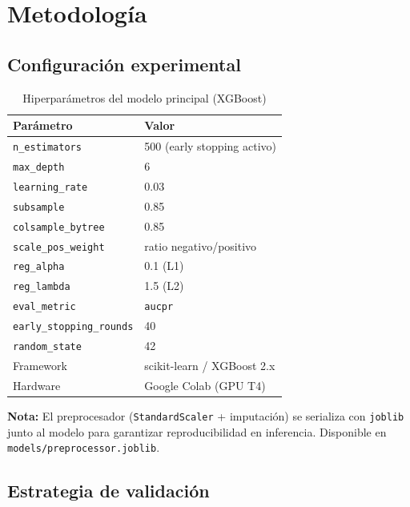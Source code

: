 \documentclass[10pt,twocolumn]{article}
\newcommand{\nota}[1]{%
  \vspace{4pt}
  \noindent\colorbox{eafitblue!8}{%
    \begin{minipage}{\columnwidth-2\fboxsep}
      \small\color{eafitblue!80}\textbf{Nota:} #1
    \end{minipage}
  }
  \vspace{4pt}
}
\begin{document}
\section{Metodología}

\subsection{Configuración experimental}

\begin{table}[H]
\centering
\caption{Hiperparámetros del modelo principal (XGBoost)}
\label{tab:hparams}
\begin{tabularx}{\columnwidth}{lX}
\toprule
\textbf{Parámetro} & \textbf{Valor} \\
\midrule
\texttt{n\_estimators} & 500 (early stopping activo) \\
\texttt{max\_depth} & 6 \\
\texttt{learning\_rate} & 0.03 \\
\texttt{subsample} & 0.85 \\
\texttt{colsample\_bytree} & 0.85 \\
\texttt{scale\_pos\_weight} & ratio negativo/positivo \\
\texttt{reg\_alpha} & 0.1 (L1) \\
\texttt{reg\_lambda} & 1.5 (L2) \\
\texttt{eval\_metric} & \texttt{aucpr} \\
\texttt{early\_stopping\_rounds} & 40 \\
\texttt{random\_state} & 42 \\
Framework & scikit-learn / XGBoost 2.x \\
Hardware & Google Colab (GPU T4) \\
\bottomrule
\end{tabularx}
\end{table}

\nota{El preprocesador (\texttt{StandardScaler} + imputación) se
  serializa con \texttt{joblib} junto al modelo para garantizar
  reproducibilidad en inferencia. Disponible en
  \texttt{models/preprocessor.joblib}.}

\subsection{Estrategia de validación}
\end{document}
